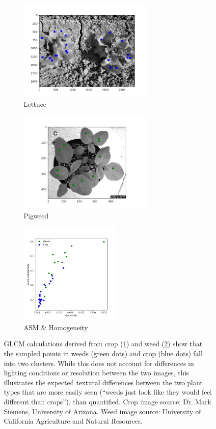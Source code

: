 \documentclass[letterpaper, notitlepage]{report}
\begin{document}
\begin{figure}[H]
	\begin{subfigure}[h]{0.28\linewidth}
		\includegraphics[height=5cm]{./figures/glcm-crop.png}
		\caption{Lettuce}
		\label{subfig:glcm_crop}	
	\end{subfigure}
	\hfill
	\begin{subfigure}[h]{0.28\linewidth}
		\includegraphics[height=5cm]{./figures/glcm-weed.png}
		\caption{Pigweed}
		\label{subfig:glcm_weed}		
	\end{subfigure}%
	\hfill
	\begin{subfigure}[h]{0.28\linewidth}
		\includegraphics[height=5cm]{./figures/glcm-plot.png}
		\caption{ASM \& Homogeneity}
		\label{subfig:glcm_plot}		
	\end{subfigure}%
	\hfill
	\caption[An example of GLCM calculations for weed and crop]{GLCM calculations derived from crop (\ref{subfig:glcm_crop}) and weed (\ref{subfig:glcm_weed}) show that the sampled points in weeds (green dots) and crop (blue dots) fall into two clusters. While this does not account for differences in lighting conditions or resolution between the two images, this illustrates the expected textural differences between the two plant types that are more easily seen (``weeds just look like they would feel different than crops''), than quantified. Crop image source: Dr. Mark Siemens, University of Arizona. Weed image source: University of California Agriculture and Natural Resources.}
	\label{fig:glcm}
\end{figure}
\end{document}
